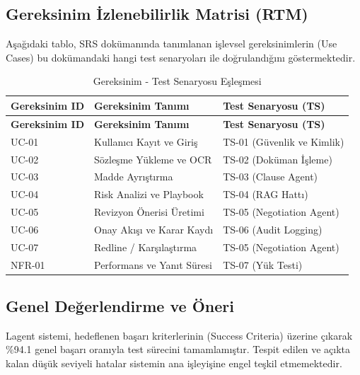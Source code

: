 \documentclass[12pt,a4paper]{article}
\begin{document}
\subsection{Gereksinim İzlenebilirlik Matrisi (RTM)}
Aşağıdaki tablo, SRS dokümanında tanımlanan işlevsel gereksinimlerin (Use Cases) bu dokümandaki hangi test senaryoları ile doğrulandığını göstermektedir.

\begin{longtable}{@{}lll@{}}
\caption{Gereksinim - Test Senaryosu Eşleşmesi} \\
\toprule
\textbf{Gereksinim ID} & \textbf{Gereksinim Tanımı} & \textbf{Test Senaryosu (TS)} \\ \midrule
\endfirsthead
\toprule
\textbf{Gereksinim ID} & \textbf{Gereksinim Tanımı} & \textbf{Test Senaryosu (TS)} \\ \midrule
\endhead
UC-01 & Kullanıcı Kayıt ve Giriş & TS-01 (Güvenlik ve Kimlik) \\
UC-02 & Sözleşme Yükleme ve OCR & TS-02 (Doküman İşleme) \\
UC-03 & Madde Ayrıştırma & TS-03 (Clause Agent) \\
UC-04 & Risk Analizi ve Playbook & TS-04 (RAG Hattı) \\
UC-05 & Revizyon Önerisi Üretimi & TS-05 (Negotiation Agent) \\
UC-06 & Onay Akışı ve Karar Kaydı & TS-06 (Audit Logging) \\
UC-07 & Redline / Karşılaştırma & TS-05 (Negotiation Agent) \\
NFR-01 & Performans ve Yanıt Süresi & TS-07 (Yük Testi) \\
\bottomrule
\end{longtable}

\subsection{Genel Değerlendirme ve Öneri}
Lagent sistemi, hedeflenen başarı kriterlerinin (Success Criteria) üzerine çıkarak \%94.1 genel başarı oranıyla test sürecini tamamlamıştır. Tespit edilen ve açıkta kalan düşük seviyeli hatalar sistemin ana işleyişine engel teşkil etmemektedir.
\end{document}
